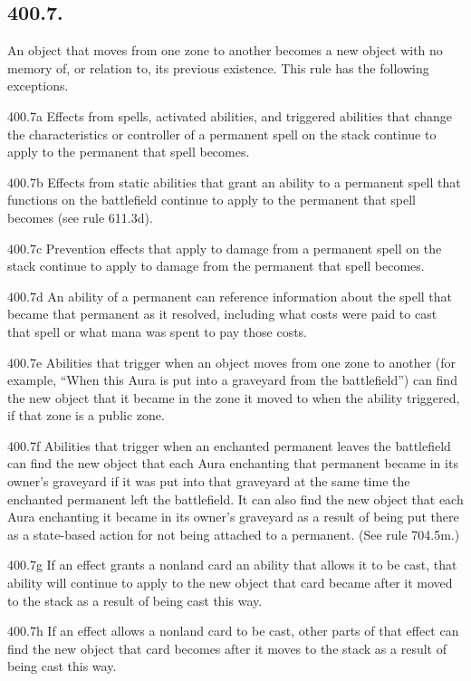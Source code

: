 \subsection*{400.7.}
An object that moves from one zone to another becomes a new object with no memory of, or relation to, its previous existence. This rule has the following exceptions.

400.7a Effects from spells, activated abilities, and triggered abilities that change the characteristics or controller of a permanent spell on the stack continue to apply to the permanent that spell becomes.

400.7b Effects from static abilities that grant an ability to a permanent spell that functions on the battlefield continue to apply to the permanent that spell becomes (see rule 611.3d).

400.7c Prevention effects that apply to damage from a permanent spell on the stack continue to apply to damage from the permanent that spell becomes.

400.7d An ability of a permanent can reference information about the spell that became that permanent as it resolved, including what costs were paid to cast that spell or what mana was spent to pay those costs.

400.7e Abilities that trigger when an object moves from one zone to another (for example, “When this Aura is put into a graveyard from the battlefield”) can find the new object that it became in the zone it moved to when the ability triggered, if that zone is a public zone.

400.7f Abilities that trigger when an enchanted permanent leaves the battlefield can find the new object that each Aura enchanting that permanent became in its owner’s graveyard if it was put into that graveyard at the same time the enchanted permanent left the battlefield. It can also find the new object that each Aura enchanting it became in its owner’s graveyard as a result of being put there as a state-based action for not being attached to a permanent. (See rule 704.5m.)

400.7g If an effect grants a nonland card an ability that allows it to be cast, that ability will continue to apply to the new object that card became after it moved to the stack as a result of being cast this way.

400.7h If an effect allows a nonland card to be cast, other parts of that effect can find the new object that card becomes after it moves to the stack as a result of being cast this way.

